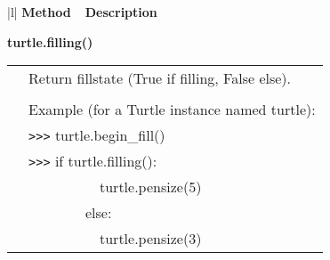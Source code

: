 \begin{center}
{\small
\begin{tabular}{|l|} \hline
{\bf Method~~Description}  \\ \hline\hline 

{\bf    turtle.filling()} \\
   \begin{tabular}{p{0.25in}p{4in}}
&        Return fillstate (True if filling, False else). \\
&  \\
&        Example (for a Turtle instance named turtle): \\
&        \verb+>+\verb+>+\verb+>+ turtle.begin\_fill() \\
&        \verb+>+\verb+>+\verb+>+ if turtle.filling(): \\
&                ~~~~~~~~~~turtle.pensize(5) \\
&        ~~~~~~~~else: \\
&                ~~~~~~~~~~turtle.pensize(3) \\
\end{tabular} \\ \hline


\end{tabular}}
\end{center}
